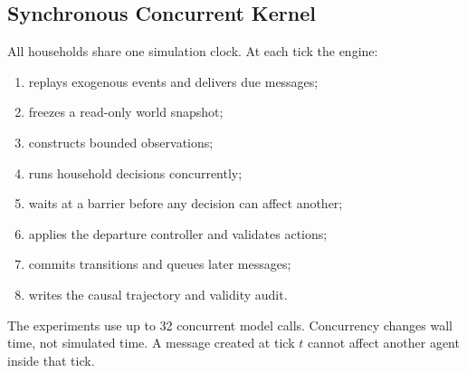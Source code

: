 \documentclass[journal]{IEEEtran}
\begin{document}
\subsection{Synchronous Concurrent Kernel}
All households share one simulation clock. At each tick the engine:
\begin{enumerate}
    \item replays exogenous events and delivers due messages;
    \item freezes a read-only world snapshot;
    \item constructs bounded observations;
    \item runs household decisions concurrently;
    \item waits at a barrier before any decision can affect another;
    \item applies the departure controller and validates actions;
    \item commits transitions and queues later messages;
    \item writes the causal trajectory and validity audit.
\end{enumerate}
The experiments use up to 32 concurrent model calls. Concurrency changes wall
time, not simulated time. A message created at tick $t$ cannot affect another
agent inside that tick.
\end{document}
